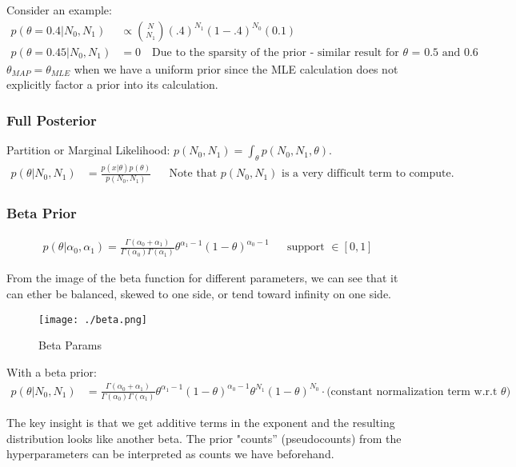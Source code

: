 \documentclass{article}
\begin{document}
\smallskip

\noindent Consider an example:
\begin{align*}
p(\theta=0.4|N_0,N_1) &\propto {\binom{N}{N_1}} (.4)^{N_1}(1-.4)^{N_0} (0.1) \\
p(\theta=0.45|N_0,N_1) &= 0 \quad \text{Due to the sparsity of the prior - similar result for $\theta$ = 0.5 and 0.6}
\end{align*}
\noindent $\theta_{MAP} = \theta_{MLE}$ when we have a uniform prior since the MLE calculation does not explicitly factor a prior into its calculation.

\subsubsection*{Full Posterior}
Partition or Marginal Likelihood: $p(N_0,N_1) = \int_\theta p(N_0,N_1,\theta)$. 
\begin{align*}
p(\theta|N_0,N_1) &= \frac{p(x|\theta) p(\theta)}{p(N_0,N_1)} && \text{Note that $p(N_0,N_1)$ is a very difficult term to compute.}
\end{align*}

\subsubsection*{Beta Prior}
\begin{align*}
p(\theta|\alpha_0,\alpha_1) = \frac{\Gamma(\alpha_0 + \alpha_1)}{\Gamma(\alpha_0)\Gamma(\alpha_1)} \theta^{\alpha_1-1} (1-\theta)^{\alpha_0-1}  && \text{support $\in [0,1]$}
\end{align*}

\noindent From the image of the beta function for different parameters, we can see that it can ether be balanced, skewed to one side, or tend toward infinity on one side.
\begin{figure}
\centering
\texttt{[image: ./beta.png]}
\caption{Beta Params}
\end{figure}

\smallskip

\noindent With a beta prior: 
\begin{align*}
p(\theta|N_0,N_1) &= \frac{\Gamma(\alpha_0 + \alpha_1)}{\Gamma(\alpha_0)\Gamma(\alpha_1)} \theta^{\alpha_1-1} (1-\theta)^{\alpha_0-1} \theta^{N_1}(1-\theta)^{N_0} \cdot \textrm{(constant normalization term w.r.t $\theta$)} 
\end{align*}

\noindent The key insight is that we get additive terms in the exponent and the resulting distribution looks like another beta. The prior "counts'' (pseudocounts) from the hyperparameters can be interpreted as counts we have beforehand. \\
\end{document}
